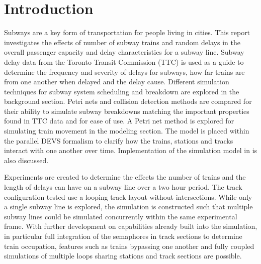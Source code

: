 \section{Introduction}

Subways are a key form of transportation for people living in cities. This
report investigates the effects of number of subway trains and random delays in the overall passenger capacity and delay characteristics for a subway line. Subway delay data from the Toronto Transit Commission (TTC) is used as a guide to determine the frequency and severity of delays for subways, how far trains are from one another when delayed and the delay cause. Different simulation techniques for subway system scheduling and breakdown are
explored in the background section. Petri nets and collision detection methods
are compared for their ability to simulate subway breakdowns matching the
important properties found in TTC data and for ease of use. A Petri net method is explored for simulating train movement in the modeling section. The model is placed within the parallel DEVS formalism to clarify how the trains, stations and tracks interact with one another over time. Implementation of the simulation model in  is also discussed.

Experiments are created to determine the effects the number of trains and the length of delays can have on a subway line over a two hour period. The track
configuration tested use a looping track layout without intersections. While only a single subway line is explored, the simulation is constructed such that multiple subway lines could be simulated concurrently within the same experimental frame. With further development on capabilities already built into the simulation, in particular full integration of the semaphores in track sections to determine train occupation, features such as trains bypassing one another and fully coupled simulations of multiple loops sharing stations and track sections are possible.